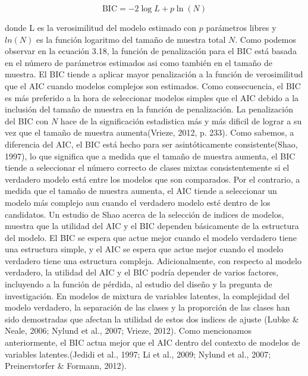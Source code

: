 	\begin{equation}
		\mathrm{BIC}=-2 \log L+p \ln (N)
		\label{3.18}
	\end{equation}
	
	donde L es la verosimilitud del modelo estimado con $p$ par\'{a}metros libres y $ln(N)$ es la funci\'{o}n logaritmo del tama\~{n}o de muestra total $N$. Como podemos observar en la ecuaci\'{o}n 3.18, la funci\'{o}n de penalizaci\'{o}n para el BIC est\'{a} basada en el n\'{u}mero de par\'{a}metros estimados asi como tambi\'{e}n en el tama\~{n}o de muestra. El BIC tiende a aplicar mayor penalizaci\'{o}n a la funci\'{o}n de verosimilitud que el AIC cuando modelos complejos son estimados. Como consecuencia, el BIC es m\'{a}s preferido a la hora de seleccionar modelos simples que el AIC debido a la inclusi\'{o}n del tama\~{n}o de muestra en la funci\'{o}n de penalizaci\'{o}n. La penalizaci\'{o}n del BIC con $N$ hace de la significaci\'{o}n estadistica m\'{a}s y m\'{a}s dificil de lograr a su vez que el tama\~{n}o de muestra aumenta(Vrieze, 2012, p. 233).
	Como sabemos, a diferencia del AIC, el BIC est\'{a} hecho para ser asint\'{o}ticamente consistente(Shao, 1997), lo que significa que a medida que el tama\~{n}o de muestra aumenta, el BIC tiende a seleccionar el n\'{u}mero correcto de clases mixtas consistentemente si el verdadero modelo est\'{a} entre los modelos que son comparados. Por el contrario, a medida que el tama\~{n}o de muestra aumenta, el AIC tiende a seleccionar un modelo m\'{a}s complejo aun cuando el verdadero modelo est\'{e} dentro de los candidatos. Un estudio de Shao acerca de la selecci\'{o}n de indices de modelos, muestra que la utilidad del AIC y el BIC dependen b\'{a}sicamente de la estructura del modelo. El BIC se espera que actue mejor cuando el modelo verdadero tiene una estructura simple, y el AIC se espera que actue mejor cuando el modelo verdadero tiene una estructura compleja.
	Adicionalmente, con respecto al modelo verdadero, la utilidad del AIC y el BIC podr\'{i}a depender de varios factores, incluyendo a la funci\'{o}n de p\'{e}rdida, al estudio del dise\~{n}o y la pregunta de investigaci\'{o}n. En modelos de mixtura de variables latentes, la complejidad del modelo verdadero, la separaci\'{o}n de las clases y la proporci\'{o}n de las clases han sido demostradas que afectan la utilidad de estos dos indices de ajuste (Lubke \& Neale, 2006;
	Nylund et al., 2007; Vrieze, 2012). Como mencionamos anteriormente, el BIC actua mejor que el AIC dentro del contexto de modelos de variables latentes.(Jedidi et al., 1997; Li et al., 2009; Nylund et al.,
	2007; Preinerstorfer \& Formann, 2012).                   
	
	
	
	
	
